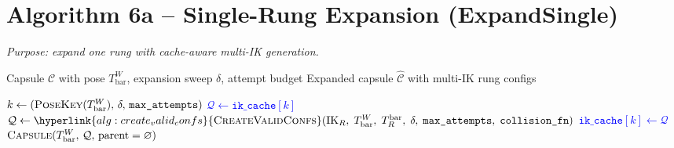 \documentclass[11pt]{article}
\newcommand{\chg}[1]{\textcolor{blue}{#1}}
\newcommand{\AlgTarget}[1]{\hypertarget{#1}{}}
\newcommand{\AlgLink}[2]{\hyperlink{#1}{#2}}
\begin{document}
\section*{Algorithm 6a -- Single-Rung Expansion (ExpandSingle)}
\noindent\textit{Purpose: expand one rung with cache-aware multi-IK generation.}
\AlgTarget{alg:expand_single}
\begin{algorithm}[H]
\caption{\textsc{ExpandSingle}($\mathcal{C},\,\delta,\,\texttt{max\_attempts}$)}
\begin{algorithmic}[1]
\Require Capsule $\mathcal{C}$ with pose $T^W_{\text{bar}}$, expansion sweep $\delta$, attempt budget
\Ensure  Expanded capsule $\hat{\mathcal{C}}$ with multi-IK rung configs

\State \chg{$k \gets (\textsc{PoseKey}(T^W_{\text{bar}}),\, \delta,\, \texttt{max\_attempts})$}
\If{\chg{$k \in \texttt{ik\_cache}$}}
  \State \chg{$\mathcal{Q} \gets \texttt{ik\_cache}[k]$}
\Else
  \State \chg{$\mathcal{Q} \gets \AlgLink{alg:create_valid_confs}{\textsc{CreateValidConfs}}(\text{IK}_R,\;T^W_{\text{bar}},\;T_R^{\text{bar}},\;\delta,\;\texttt{max\_attempts},\;\texttt{collision\_fn})$}
  \State \chg{$\texttt{ik\_cache}[k] \gets \mathcal{Q}$}
\EndIf
\State \Return \chg{$\textsc{Capsule}(T^W_{\text{bar}},\,\mathcal{Q},\,\text{parent}=\varnothing)$}
\end{algorithmic}
\end{algorithm}

\end{document}
